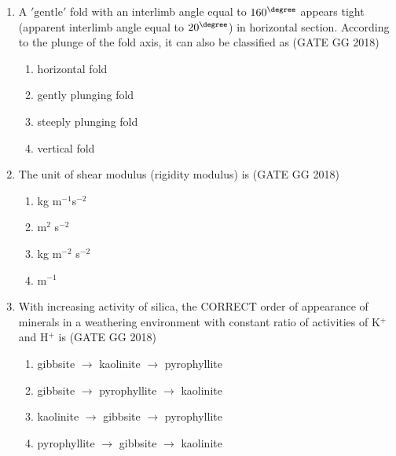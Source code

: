 \documentclass[journal]{IEEEtran}
\begin{document}
\begin{enumerate}[start=1]
\item A $'\text{gentle}'$ fold with an interlimb angle equal to $160^\degree$ appears tight (apparent interlimb angle equal to $20^\degree$) in horizontal section. According to the plunge of the fold axis, it can also be classified as
\hfill(GATE GG 2018)
\begin{multicols}{2}
\begin{enumerate}
\item horizontal fold
\item gently plunging fold
\item steeply plunging fold
\item vertical fold
\end{enumerate}
\end{multicols}

\item The unit of shear modulus (rigidity modulus) is  
\hfill(GATE GG 2018)
\begin{multicols}{2}
\begin{enumerate}
\item kg m$^{-1}$s$^{-2}$
\item m$^2$ s$^{-2}$
\item kg m$^{-2}$ s$^{-2}$
\item m$^{-1}$
\end{enumerate}
\end{multicols}

\item With increasing activity of silica, the CORRECT order of appearance of minerals in a 
weathering environment with constant ratio of activities of K$^+$ and H$^+$ is  
\hfill(GATE GG 2018)
\begin{enumerate}
\item gibbsite $\to$ kaolinite $\to$ pyrophyllite
\item gibbsite $\to$ pyrophyllite $\to$ kaolinite
\item kaolinite $\to$ gibbsite $\to$ pyrophyllite
\item pyrophyllite $\to$ gibbsite $\to$ kaolinite
\end{enumerate}


\end{enumerate}
\end{document}
